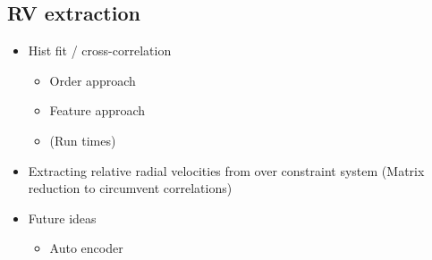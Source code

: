     \vspace{0.5cm}




\subsection{RV extraction}
    \begin{itemize}
        \item Hist fit / cross-correlation
        \begin{itemize}
            \item Order approach
            \item Feature approach
            \item (Run times)
        \end{itemize}
        \item Extracting relative radial velocities from over constraint system (Matrix reduction to circumvent correlations)
        \item Future ideas
        \begin{itemize}
            \item Auto encoder
        \end{itemize}
    \end{itemize}
